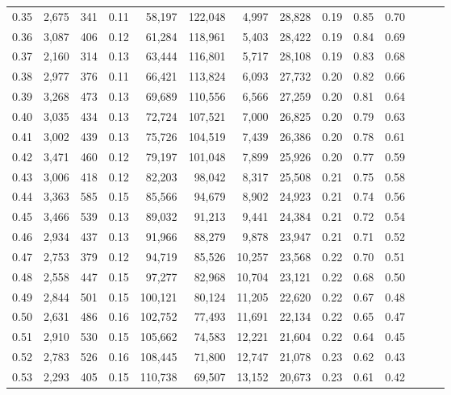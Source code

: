 \begin{tabular}{rrrrrrrrrrrrrr}
0.35 &  2,675 &  341 &  0.11 &   58,197 &  122,048 &   4,997 &  28,828 &  0.19 &  0.85 &      0.70 \\
0.36 &  3,087 &  406 &  0.12 &   61,284 &  118,961 &   5,403 &  28,422 &  0.19 &  0.84 &      0.69 \\
0.37 &  2,160 &  314 &  0.13 &   63,444 &  116,801 &   5,717 &  28,108 &  0.19 &  0.83 &      0.68 \\
0.38 &  2,977 &  376 &  0.11 &   66,421 &  113,824 &   6,093 &  27,732 &  0.20 &  0.82 &      0.66 \\
0.39 &  3,268 &  473 &  0.13 &   69,689 &  110,556 &   6,566 &  27,259 &  0.20 &  0.81 &      0.64 \\
0.40 &  3,035 &  434 &  0.13 &   72,724 &  107,521 &   7,000 &  26,825 &  0.20 &  0.79 &      0.63 \\
0.41 &  3,002 &  439 &  0.13 &   75,726 &  104,519 &   7,439 &  26,386 &  0.20 &  0.78 &      0.61 \\
0.42 &  3,471 &  460 &  0.12 &   79,197 &  101,048 &   7,899 &  25,926 &  0.20 &  0.77 &      0.59 \\
0.43 &  3,006 &  418 &  0.12 &   82,203 &   98,042 &   8,317 &  25,508 &  0.21 &  0.75 &      0.58 \\
0.44 &  3,363 &  585 &  0.15 &   85,566 &   94,679 &   8,902 &  24,923 &  0.21 &  0.74 &      0.56 \\
0.45 &  3,466 &  539 &  0.13 &   89,032 &   91,213 &   9,441 &  24,384 &  0.21 &  0.72 &      0.54 \\
0.46 &  2,934 &  437 &  0.13 &   91,966 &   88,279 &   9,878 &  23,947 &  0.21 &  0.71 &      0.52 \\
0.47 &  2,753 &  379 &  0.12 &   94,719 &   85,526 &  10,257 &  23,568 &  0.22 &  0.70 &      0.51 \\
0.48 &  2,558 &  447 &  0.15 &   97,277 &   82,968 &  10,704 &  23,121 &  0.22 &  0.68 &      0.50 \\
0.49 &  2,844 &  501 &  0.15 &  100,121 &   80,124 &  11,205 &  22,620 &  0.22 &  0.67 &      0.48 \\
0.50 &  2,631 &  486 &  0.16 &  102,752 &   77,493 &  11,691 &  22,134 &  0.22 &  0.65 &      0.47 \\
0.51 &  2,910 &  530 &  0.15 &  105,662 &   74,583 &  12,221 &  21,604 &  0.22 &  0.64 &      0.45 \\
0.52 &  2,783 &  526 &  0.16 &  108,445 &   71,800 &  12,747 &  21,078 &  0.23 &  0.62 &      0.43 \\
0.53 &  2,293 &  405 &  0.15 &  110,738 &   69,507 &  13,152 &  20,673 &  0.23 &  0.61 &      0.42 \\

\end{tabular}
